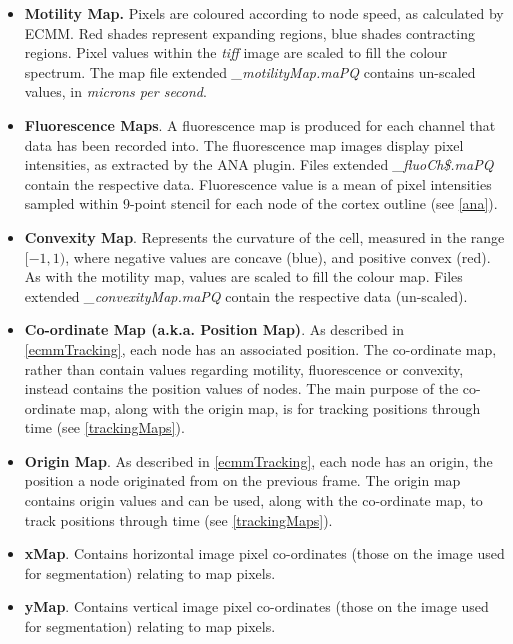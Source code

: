 \documentclass[a4paper,12pt]{article}
\begin{document}
\begin{itemize}

\item \textbf{Motility Map.}   Pixels are coloured according to node speed, as calculated by ECMM.  Red shades 
represent expanding regions, blue shades contracting regions.  Pixel values
within the \textit{tiff} image are scaled to fill the colour spectrum.  The map file extended \textit{\_motilityMap.maPQ} contains 
un-scaled values, in \textit{microns per second}. 

\item \textbf{Fluorescence Maps}.  A fluorescence map is produced for each channel that data has been 
recorded into.  The fluorescence map images display pixel intensities, as extracted by the ANA plugin.
Files extended \textit{\_fluoCh\$.maPQ} contain the respective data. Fluorescence value is a mean of pixel intensities sampled within 9-point stencil for each node of the cortex outline (see \autoref{ana}).

\item \textbf{Convexity Map}.   Represents the curvature of the cell, measured in the range $[-1,1)$, where negative values are concave (blue),
and positive convex (red).
As with the motility map, values
are scaled to fill the colour map. Files extended \textit{\_convexityMap.maPQ} contain the respective data (un-scaled). 

\item \textbf{Co-ordinate Map (a.k.a. Position Map)}.  As described in \autoref{ecmmTracking}, each node has an
associated position.  The co-ordinate map, rather than contain values regarding
motility, fluorescence or convexity, instead contains the position values of nodes.  The main
purpose of the co-ordinate map, along with the origin map, is for tracking positions through time (see \autoref{trackingMaps}).

\item \textbf{Origin Map}. As described in \autoref{ecmmTracking}, each node has an origin, the position a node originated from
on the previous frame.  The origin map contains origin values and can be used, along
with the co-ordinate map, to track positions through time (see \autoref{trackingMaps}).

\item \textbf{xMap}.  Contains horizontal image pixel co-ordinates (those on the image used for segmentation) relating to map pixels.

\item \textbf{yMap}.  Contains vertical image pixel co-ordinates (those on the image used for segmentation) relating to map pixels.

\end{itemize}
\end{document}
